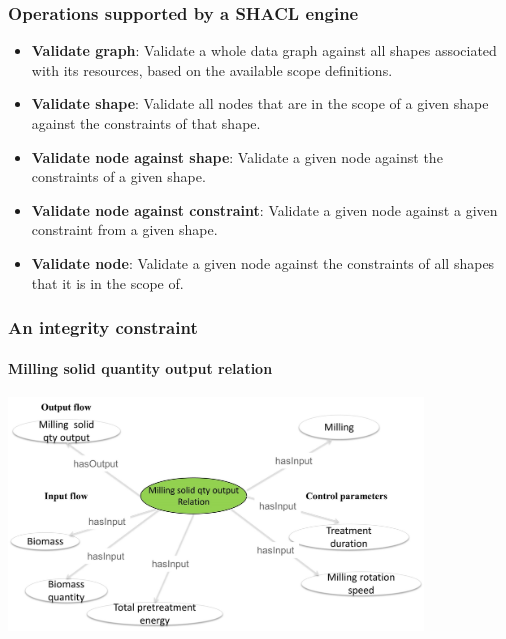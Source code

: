\documentclass{beamer}
\begin{document}
\begin{frame}
  \frametitle{Operations supported by a SHACL engine}

  \pause

  \begin{itemize}
    \item \textbf{Validate graph}: Validate a whole data graph against all
      shapes associated with its resources, based on the available scope
      definitions.

    \pause

    \item \textbf{Validate shape}: Validate all nodes that are in the scope of a
      given shape against the constraints of that shape.

    \pause

    \item \textbf{Validate node against shape}: Validate a given node against
      the constraints of a given shape.

    \pause

    \item \textbf{Validate node against constraint}: Validate a given node
      against a given constraint from a given shape.

    \pause

    \item \textbf{Validate node}: Validate a given node against the constraints
      of all shapes that it is in the scope of.
  \end{itemize}
\end{frame}

\begin{frame}
  \frametitle{An integrity constraint}
  \framesubtitle{Milling solid quantity output relation}

  \begin{center}
  \includegraphics[width=11cm]{relation.jpg}
  \end{center}
\end{frame}
\end{document}
